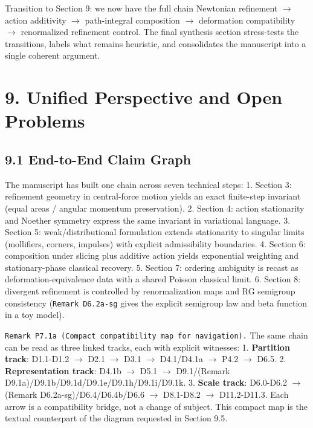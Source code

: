 \documentclass[
]{article}
\begin{document}
Transition to Section 9: we now have the full chain Newtonian refinement
\(\to\) action additivity \(\to\) path-integral composition \(\to\)
deformation compatibility \(\to\) renormalized refinement control. The
final synthesis section stress-tests the transitions, labels what
remains heuristic, and consolidates the manuscript into a single
coherent argument.

\hypertarget{unified-perspective-and-open-problems}{%
\section{9. Unified Perspective and Open
Problems}\label{unified-perspective-and-open-problems}}

\hypertarget{end-to-end-claim-graph}{%
\subsection{9.1 End-to-End Claim Graph}\label{end-to-end-claim-graph}}

The manuscript has built one chain across seven technical steps: 1.
Section 3: refinement geometry in central-force motion yields an exact
finite-step invariant (equal areas / angular momentum preservation). 2.
Section 4: action stationarity and Noether symmetry express the same
invariant in variational language. 3. Section 5: weak/distributional
formulation extends stationarity to singular limits (mollifiers,
corners, impulses) with explicit admissibility boundaries. 4. Section 6:
composition under slicing plus additive action yields exponential
weighting and stationary-phase classical recovery. 5. Section 7:
ordering ambiguity is recast as deformation-equivalence data with a
shared Poisson classical limit. 6. Section 8: divergent refinement is
controlled by renormalization maps and RG semigroup consistency
(\texttt{Remark\ D6.2a-sg} gives the explicit semigroup law and beta
function in a toy model).

\texttt{Remark\ P7.1a\ (Compact\ compatibility\ map\ for\ navigation).}
The same chain can be read as three linked tracks, each with explicit
witnesses: 1. \textbf{Partition track}: D1.1-D1.2 \(\to\) D2.1 \(\to\)
D3.1 \(\to\) D4.1/D4.1a \(\to\) P4.2 \(\to\) D6.5. 2.
\textbf{Representation track}: D4.1b \(\to\) D5.1 \(\to\) D9.1/(Remark
D9.1a)/D9.1b/D9.1d/D9.1e/D9.1h/D9.1i/D9.1k. 3. \textbf{Scale track}:
D6.0-D6.2 \(\to\) (Remark D6.2a-sg)/D6.4/D6.4b/D6.6 \(\to\) D8.1-D8.2
\(\to\) D11.2-D11.3. Each arrow is a compatibility bridge, not a change
of subject. This compact map is the textual counterpart of the diagram
requested in Section 9.5.
\end{document}
